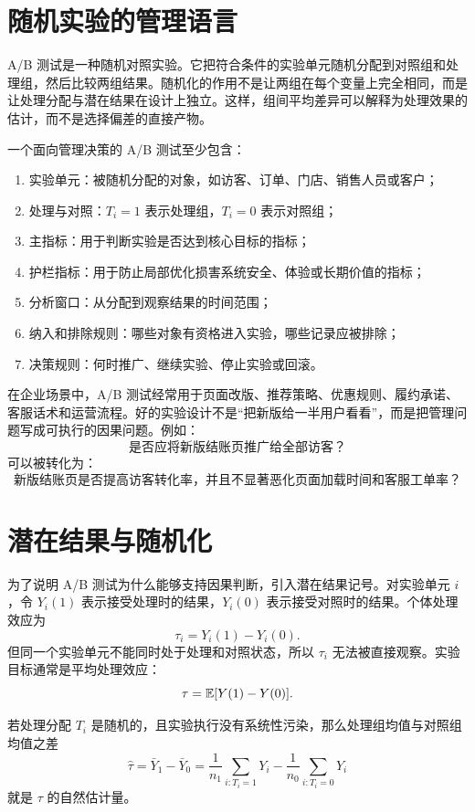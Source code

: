 \documentclass[UTF8,fontset=fandol,openany,zihao=-4]{ctexbook}
\begin{document}
\section{随机实验的管理语言}

A/B 测试是一种随机对照实验。它把符合条件的实验单元随机分配到对照组和处理组，然后比较两组结果。随机化的作用不是让两组在每个变量上完全相同，而是让处理分配与潜在结果在设计上独立。这样，组间平均差异可以解释为处理效果的估计，而不是选择偏差的直接产物。

\begin{definition}[A/B 测试的基本元素]
一个面向管理决策的 A/B 测试至少包含：
\begin{enumerate}
  \item 实验单元：被随机分配的对象，如访客、订单、门店、销售人员或客户；
  \item 处理与对照：\(T_i=1\) 表示处理组，\(T_i=0\) 表示对照组；
  \item 主指标：用于判断实验是否达到核心目标的指标；
  \item 护栏指标：用于防止局部优化损害系统安全、体验或长期价值的指标；
  \item 分析窗口：从分配到观察结果的时间范围；
  \item 纳入和排除规则：哪些对象有资格进入实验，哪些记录应被排除；
  \item 决策规则：何时推广、继续实验、停止实验或回滚。
\end{enumerate}
\end{definition}

在企业场景中，A/B 测试经常用于页面改版、推荐策略、优惠规则、履约承诺、客服话术和运营流程。好的实验设计不是“把新版给一半用户看看”，而是把管理问题写成可执行的因果问题。例如：
\[
  \text{是否应将新版结账页推广给全部访客？}
\]
可以被转化为：
\[
  \text{新版结账页是否提高访客转化率，并且不显著恶化页面加载时间和客服工单率？}
\]

\section{潜在结果与随机化}

为了说明 A/B 测试为什么能够支持因果判断，引入潜在结果记号。对实验单元 \(i\)，令 \(Y_i(1)\) 表示接受处理时的结果，\(Y_i(0)\) 表示接受对照时的结果。个体处理效应为
\[
  \tau_i=Y_i(1)-Y_i(0).
\]
但同一个实验单元不能同时处于处理和对照状态，所以 \(\tau_i\) 无法被直接观察。实验目标通常是平均处理效应：
\[
  \tau=\mathbb E[Y(1)-Y(0)].
\]

若处理分配 \(T_i\) 是随机的，且实验执行没有系统性污染，那么处理组均值与对照组均值之差
\[
  \hat\tau
  =\bar Y_1-\bar Y_0
  =\frac{1}{n_1}\sum_{i:T_i=1}Y_i
   -\frac{1}{n_0}\sum_{i:T_i=0}Y_i
\]
就是 \(\tau\) 的自然估计量。
\end{document}

